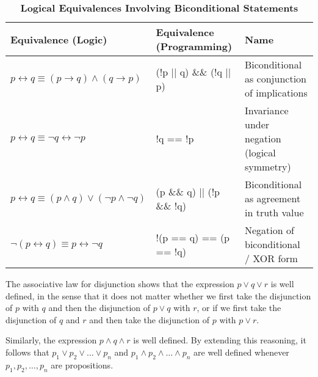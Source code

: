\begin{table}[h!]
\centering
\renewcommand{\arraystretch}{1.3} %
\caption*{\textbf{Logical
Equivalences Involving
Biconditional Statements}}
\begin{tabular}{|
    >{\centering\arraybackslash}m{5cm}
    |>{\centering\arraybackslash}m{5cm}
    |>{\centering\arraybackslash}m{6cm}|}
\hline
\rowcolor{gray!20}
\textbf{Equivalence (Logic)} & \textbf{Equivalence (Programming)} &\textbf{Name} \\
\hline
$p \leftrightarrow q \equiv (p \rightarrow q) \land (q \rightarrow p)$ &  (!p || q) \&\& (!q || p) & Biconditional as conjunction of implications   \\
\hline
$p \leftrightarrow q \equiv \neg q \leftrightarrow \neg p$ & !q == !p & Invariance under negation (logical symmetry)  \\
\hline
$p \leftrightarrow q \equiv (p \land q) \lor (\neg p \land \neg q)$ & (p \&\& q) || (!p \&\& !q) & Biconditional as agreement in truth value  \\
\hline
$\neg (p \leftrightarrow q) \equiv p \leftrightarrow \neg q$ & !(p == q) == (p == !q) & Negation of biconditional / XOR form \\
\hline
\end{tabular}
\end{table}


\begin{tcolorbox}[colback=white, colframe=gray!60, title=Remark 5]
The associative law for disjunction shows that the expression $p \lor q \lor r$ is well defined, in
the sense that it does not matter whether we first take the disjunction of $p$ with $q$ and then
the disjunction of $p\lor q$ with $r$, or if we first take the disjunction of $q$ and $r$ and then take the
disjunction of $p$ with $p \lor r$.
\end{tcolorbox}
\begin{tcolorbox}[colback=white, colframe=gray!60, title=Remark 6]
Similarly, the expression $p \land q \land r$ is well defined. By extending
this reasoning, it follows that $p_1 \lor p_2  \lor \ldots \lor p_n$ and $p_1 \land p_2 \land \ldots \land p_n$ are well defined whenever
$p_1, p_2,\ldots, p_n$ are propositions.
\end{tcolorbox}

